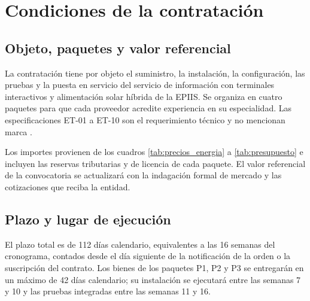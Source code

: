 \section{Condiciones de la contratación}\label{sec:condiciones}
\subsection{Objeto, paquetes y valor referencial}
La contratación tiene por objeto el suministro, la instalación, la configuración, las pruebas y la puesta en servicio del servicio de información con terminales interactivos y alimentación solar híbrida de la EPIIS. Se organiza en cuatro paquetes para que cada proveedor acredite experiencia en su especialidad. Las especificaciones ET-01 a ET-10 son el requerimiento técnico y no mencionan marca \cite{compatibilizacion}.

Los importes provienen de los cuadros \ref{tab:precios_energia} a \ref{tab:presupuesto} e incluyen las reservas tributarias y de licencia de cada paquete. El valor referencial de la convocatoria se actualizará con la indagación formal de mercado y las cotizaciones que reciba la entidad.

\subsection{Plazo y lugar de ejecución}
El plazo total es de 112 días calendario, equivalentes a las 16 semanas del cronograma, contados desde el día siguiente de la notificación de la orden o la suscripción del contrato. Los bienes de los paquetes P1, P2 y P3 se entregarán en un máximo de 42 días calendario; su instalación se ejecutará entre las semanas 7 y 10 y las pruebas integradas entre las semanas 11 y 16.


